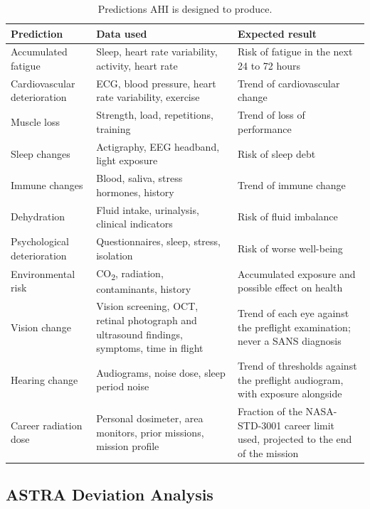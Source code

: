 \begin{table}[htbp]
\centering
\vspace{0.8em}
\caption{Predictions AHI is designed to produce.}
\label{tab:predictions}
\footnotesize
\begin{tabular}{p{3.4cm}p{5.4cm}p{5.2cm}}
\hline
\textbf{Prediction} & \textbf{Data used} & \textbf{Expected result} \\
\hline
Accumulated fatigue & Sleep, heart rate variability, activity, heart rate & Risk of fatigue in the next 24 to 72 hours \\
Cardiovascular deterioration & ECG, blood pressure, heart rate variability, exercise & Trend of cardiovascular change \\
Muscle loss & Strength, load, repetitions, training & Trend of loss of performance \\
Sleep changes & Actigraphy, EEG headband, light exposure & Risk of sleep debt \\
Immune changes & Blood, saliva, stress hormones, history & Trend of immune change \\
Dehydration & Fluid intake, urinalysis, clinical indicators & Risk of fluid imbalance \\
Psychological deterioration & Questionnaires, sleep, stress, isolation & Risk of worse well-being \\
Environmental risk & CO\textsubscript{2}, radiation, contaminants, history & Accumulated exposure and possible effect on health \\
Vision change & Vision screening, OCT, retinal photograph and ultrasound findings, symptoms, time in flight & Trend of each eye against the preflight examination; never a SANS diagnosis \\
Hearing change & Audiograms, noise dose, sleep period noise & Trend of thresholds against the preflight audiogram, with exposure alongside \\
Career radiation dose & Personal dosimeter, area monitors, prior missions, mission profile & Fraction of the NASA-STD-3001 career limit used, projected to the end of the mission \\
\hline
\end{tabular}
\vspace{1.2em}
\end{table}

\subsection{ASTRA Deviation Analysis}
\label{subsec:astra}

